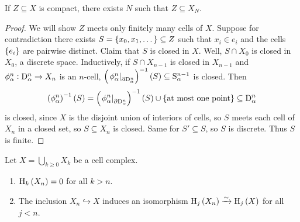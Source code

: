 \begin{proposition}
If $ Z \subseteq X $ is compact, there exists $ N $ such that $ Z \subseteq X_N $.
\end{proposition}

\begin{proof}
We will show $ Z $ meets only finitely many cells of $ X $. Suppose for contradiction there exists $ S = \cbr{x_0, x_1, \dots} \subseteq Z $ such that $ x_i \in e_i $ and the cells $ \cbr{e_i} $ are pairwise distinct. Claim that $ S $ is closed in $ X $. Well, $ S \cap X_0 $ is closed in $ X_0 $, a discrete space. Inductively, if $ S \cap X_{n - 1} $ is closed in $ X_{n - 1} $ and $ \phi_\alpha^n : \mathrm{D}_\alpha^n \to X_n $ is an $ n $-cell, $ \br{\eval{\phi_\alpha^n}_{\da\D_\alpha^n}}^{-1}\br{S} \subseteq \S_\alpha^{n - 1} $ is closed. Then
$$ \br{\phi_\alpha^n}^{-1}\br{S} = \br{\eval{\phi_\alpha^n}_{\da\D_\alpha^n}}^{-1}\br{S} \cup \cbr{\text{at most one point}} \subseteq \D_\alpha^n $$
is closed, since $ X $ is the disjoint union of interiors of cells, so $ S $ meets each cell of $ X_n $ in a closed set, so $ S \subseteq X_n $ is closed. Same for $ S' \subseteq S $, so $ S $ is discrete. Thus $ S $ is finite.
\end{proof}

\pagebreak

\begin{proposition}
Let $ X = \bigcup_{k \ge 0} X_k $ be a cell complex.
\begin{enumerate}
\item $ \H_k\br{X_n} = 0 $ for all $ k > n $.
\item The inclusion $ X_n \hookrightarrow X $ induces an isomorphism $ \H_j\br{X_n} \xrightarrow{\sim} \H_j\br{X} $ for all $ j < n $.
\end{enumerate}
\end{proposition}


